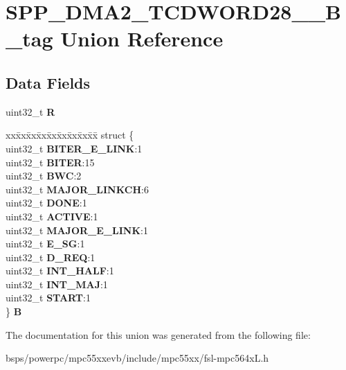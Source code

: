 \hypertarget{unionSPP__DMA2__TCDWORD28____32B__tag}{}\section{S\+P\+P\+\_\+\+D\+M\+A2\+\_\+\+T\+C\+D\+W\+O\+R\+D28\+\_\+\+\_\+B\+\_\+tag Union Reference}
\label{unionSPP__DMA2__TCDWORD28____32B__tag}
\subsection*{Data Fields}
\begin{DoxyCompactItemize}
\item 
\mbox{\label{unionSPP__DMA2__TCDWORD28____32B__tag_a81676eb9f019ef9035c9fd41d5753d30}} 
uint32\+\_\+t {\bfseries R}
\item 
\mbox{\label{unionSPP__DMA2__TCDWORD28____32B__tag_a8fd486095feffc98d401fb190ccd30ac}} 
\begin{tabbing}
xx\=xx\=xx\=xx\=xx\=xx\=xx\=xx\=xx\=\kill
struct \{\\
\>uint32\_t {\bfseries BITER\_E\_LINK}:1\\
\>uint32\_t {\bfseries BITER}:15\\
\>uint32\_t {\bfseries BWC}:2\\
\>uint32\_t {\bfseries MAJOR\_LINKCH}:6\\
\>uint32\_t {\bfseries DONE}:1\\
\>uint32\_t {\bfseries ACTIVE}:1\\
\>uint32\_t {\bfseries MAJOR\_E\_LINK}:1\\
\>uint32\_t {\bfseries E\_SG}:1\\
\>uint32\_t {\bfseries D\_REQ}:1\\
\>uint32\_t {\bfseries INT\_HALF}:1\\
\>uint32\_t {\bfseries INT\_MAJ}:1\\
\>uint32\_t {\bfseries START}:1\\
\} {\bfseries B}\\

\end{tabbing}\end{DoxyCompactItemize}


The documentation for this union was generated from the following file\+:\begin{DoxyCompactItemize}
\item 
bsps/powerpc/mpc55xxevb/include/mpc55xx/fsl-\/mpc564x\+L.\+h\end{DoxyCompactItemize}
